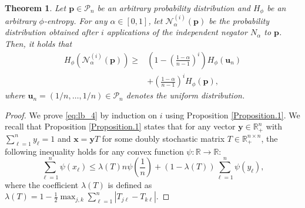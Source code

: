 \documentclass[pdflatex,sn-basic,iicol]{sn-jnl}%
\theoremstyle{thmstyleone}%
\newtheorem{theorem}{Theorem}%
\theoremstyle{thmstyletwo}%
\theoremstyle{thmstylethree}%
\newcommand{\N}{\mathcal{N}}
\newcommand{\cP}{\mathcal{P}}
\newcommand{\bp}{\mathbf{p}}
\newcommand{\bu}{\mathbf{u}}
\newcommand{\x}{\mathbf{x}}
\newcommand{\y}{\mathbf{y}}
\begin{document}
\begin{theorem}\label{th:lb_alpha}
    Let $\bp\in \cP_n$ be an arbitrary probability distribution and $H_\phi$ be an arbitrary $\phi$-entropy. For any $\alpha\in[0,1]$, let $\N_\alpha^{(i)}(\bp)$ be the probability distribution obtained after $i$ applications of the independent negator $N_\alpha$ to $\bp$. Then, it holds that
\begin{align}\label{eq:lb_4}
    H_\phi(\N_\alpha^{(i)}(\bp)) \geq &\left(1-\left(\frac{1-\alpha}{n-1}\right)^i\right)H_\phi(\bu_n) \nonumber \\ &+\left(\frac{1-\alpha}{n-1}\right)^i H_\phi(\bp),
\end{align}
where $\bu_n=(1/n,\dots,1/n)\in\cP_n$ denotes the uniform distribution.
\end{theorem}
\begin{proof}
    {We prove \eqref{eq:lb_4} by induction on $i$ using Proposition \ref{Proposition.1}.}
    We recall that Proposition \ref{Proposition.1} states that for any vector $\y\in\mathbb{R}_+^n$ with $\sum_{\ell=1}^n y_{\ell}=1$ and $\x=\y T$ for some doubly stochastic matrix $T\in\mathbb{R}_+^{n\times n}$, the following inequality holds for any convex function $\psi:\mathbb{R}\to \mathbb{R}$:
    \begin{equation}\label{eq:prop2recall_2}
        \sum_{\ell=1}^n\psi(x_{\ell})\leq \lambda(T)n\psi\left(\frac{1}{n}\right)+(1-\lambda(T))\sum_{\ell=1}^n\psi(y_{\ell}),
    \end{equation}
    where the coefficient $\lambda(T)$ is defined as $\lambda(T)=1-\frac{1}{2}\max_{j,k}\sum_{\ell=1}^n|T_{j\ell}-T_{k\ell}|$.


\end{proof}
\end{document}
